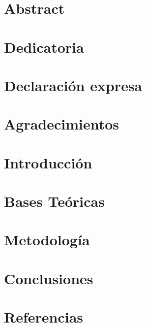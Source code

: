 \documentclass[12pt,twoside]{report}
\begin{document}
    
        
    
        
        \chapter*{Abstract}
        
        
        \chapter*{Dedicatoria}
        
        
        \chapter*{Declaración expresa}
        
        
        \chapter*{Agradecimientos}
        
        
        \tableofcontents
        
        \listoffigures
         
        \listoftables
        
        \chapter{Introducción}
        
        \chapter{Bases Teóricas}
        
        \chapter{Metodología}
        
        \chapter{Conclusiones}
        
        \chapter{Referencias}
         
        
        
    
    
\end{document}
